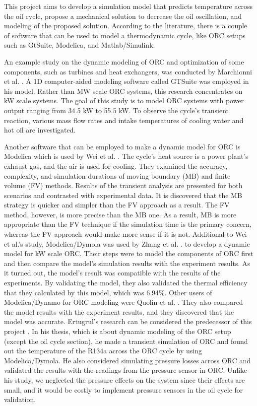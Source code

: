 This project aims to develop a simulation model that predicts temperature across the oil cycle, propose a mechanical solution to decrease the oil oscillation, and modeling of the proposed solution. According to the literature, there is a couple of software that can be used to model a thermodynamic cycle, like ORC setups such as GtSuite, Modelica, and Matlab/Simulink.
	
An example study on the dynamic modeling of ORC and optimization of some components, such as turbines and heat exchangers, was conducted by Marchionni et al. \cite{marchi}. A 1D computer-aided modeling software called GTSuite was employed in his model. Rather than MW scale ORC systems, this research concentrates on kW scale systems. The goal of this study is to model ORC systems with power output ranging from 34.5 kW to 55.5 kW. To observe the cycle's transient reaction, various mass flow rates and intake temperatures of cooling water and hot oil are investigated.
	
Another software that can be employed to make a dynamic model for ORC is Modelica which is used by Wei et al. \cite{wei}. The cycle's heat source is a power plant's exhaust gas, and the air is used for cooling. They examined the accuracy, complexity, and simulation durations of moving boundary (MB) and finite volume (FV) methods. Results of the transient analysis are presented for both scenarios and contrasted with experimental data. It is discovered that the MB strategy is quicker and simpler than the FV approach as a result. The FV method, however, is more precise than the MB one. As a result, MB is more appropriate than the FV technique if the simulation time is the primary concern, whereas the FV approach would make more sense if it is not. Additional to Wei et al.'s study, Modelica/Dymola was used by Zhang et al. \cite{zhang}. to develop a dynamic model for kW scale ORC. Their steps were to model the components of ORC first and then compare the model's simulation results with the experiment results. As it turned out, the model's result was compatible with the results of the experiments. By validating the model, they also validated the thermal efficiency that they calculated by this model, which was 6.94\%. Other users of Modelica/Dynamo for ORC modeling were Quolin et al. \cite{quoilin}. They also compared the model results with the experiment results, and they discovered that the model was accurate. Ertugrul's research can be considered the predecessor of this project \cite{altun}. In his thesis, which is about dynamic modeling of the ORC setup (except the oil cycle section), he made a transient simulation of ORC and found out the temperature of the R134a across the ORC cycle by using Modelica/Dymola. He also considered simulating pressure losses across ORC and validated the results with the readings from the pressure sensor in ORC. Unlike his study, we neglected the pressure effects on the system since their effects are small, and it would be costly to implement pressure sensors in the oil cycle for validation.
	
